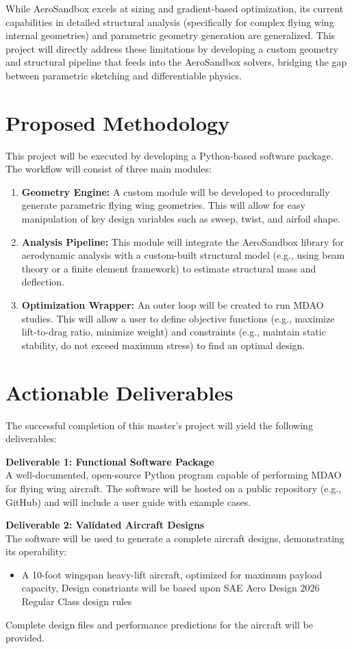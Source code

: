\documentclass[12pt]{article}
\begin{document}
While AeroSandbox excels at sizing and gradient-based optimization, its current capabilities in detailed structural analysis (specifically for complex flying wing internal geometries) and parametric geometry generation are generalized. This project will directly address these limitations by developing a custom geometry and structural pipeline that feeds into the AeroSandbox solvers, bridging the gap between parametric sketching and differentiable physics.

\section{Proposed Methodology}
This project will be executed by developing a Python-based software package. The workflow will consist of three main modules:
\begin{enumerate}
    \item \textbf{Geometry Engine:} A custom module will be developed to procedurally generate parametric flying wing geometries. This will allow for easy manipulation of key design variables such as sweep, twist, and airfoil shape.
    \item \textbf{Analysis Pipeline:} This module will integrate the AeroSandbox library for aerodynamic analysis with a custom-built structural model (e.g., using beam theory or a finite element framework) to estimate structural mass and deflection.
    \item \textbf{Optimization Wrapper:} An outer loop will be created to run MDAO studies. This will allow a user to define objective functions (e.g., maximize lift-to-drag ratio, minimize weight) and constraints (e.g., maintain static stability, do not exceed maximum stress) to find an optimal design.
\end{enumerate}

\section{Actionable Deliverables}
The successful completion of this master's project will yield the following deliverables:

\textbf{Deliverable 1: Functional Software Package} \\
A well-documented, open-source Python program capable of performing MDAO for flying wing aircraft. The software will be hosted on a public repository (e.g., GitHub) and will include a user guide with example cases.

\textbf{Deliverable 2: Validated Aircraft Designs} \\
The software will be used to generate a complete aircraft designs, demonstrating its operability:
\begin{itemize}
    \item A 10-foot wingspan heavy-lift aircraft, optimized for maximum payload capacity, Design constriants will be based upon SAE Aero Design 2026 Regular Class design rules
\end{itemize}
Complete design files and performance predictions for the aircraft will be provided.
\end{document}
